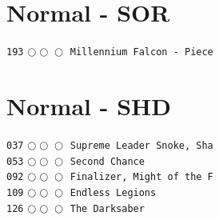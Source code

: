 \documentclass[a4paper,landscape]{article}
\begin{document}
\fontsize{8}{8}\selectfont

\begin{multicols*}{5}
    \section{Normal - SOR} 
\vspace{-2mm} 
\texttt{193} \(\bigcirc\!\bigcirc\!\bigcirc\)  \texttt{Millennium Falcon - Piece} \vspace{-0.3mm}\\ 
\section{Normal - SHD} 
\vspace{-2mm} 
\texttt{037} \(\bigcirc\!\bigcirc\!\bigcirc\)  \texttt{Supreme Leader Snoke, Sha} \vspace{-0.3mm}\\ 
\texttt{053} \(\bigcirc\!\bigcirc\!\bigcirc\)  \texttt{Second Chance} \vspace{-0.3mm}\\ 
\texttt{092} \(\bigcirc\!\bigcirc\!\bigcirc\)  \texttt{Finalizer, Might of the F} \vspace{-0.3mm}\\ 
\texttt{109} \(\bigcirc\!\bigcirc\!\bigcirc\)  \texttt{Endless Legions} \vspace{-0.3mm}\\ 
\texttt{126} \(\bigcirc\!\bigcirc\!\bigcirc\)  \texttt{The Darksaber} \vspace{-0.3mm}\\ 

\end{multicols*}
\end{document}
